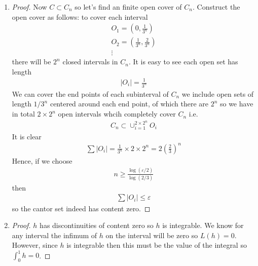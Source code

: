\begin{enumerate}[label=(\alph*)]
    \item 
    \begin{proof}
        Now $C\subset C_n$ so let's find an finite open cover of 
        $C_n$. Construct the open cover as follows: to cover each interval 
        \begin{gather*}
            O_1 = (0,\frac{1}{3^n}) \\
            O_2 = (\frac{1}{3^n},\frac{2}{3^n}) \\
            \vdots
        \end{gather*}
        there will be $2^n$ closed intervals in $C_n$. It is easy to see 
        each open set has length 
        \begin{align*}
            |O_i| = \frac{1}{3^n}
        \end{align*}
        We can cover the end points of each subinterval of $C_n$ we include 
        open sets of length $1/3^n$ centered around each end point, of which 
        there are $2^n$ so we have in total $2\times 2^n$ open intervals whcih 
        completely cover $C_n$ i.e. 
        \begin{align*}
            C_n \subset \cup_{i=1}^{2 \times 2^n} O_i
        \end{align*}
        It is clear 
        \begin{align*}
            \sum |O_i| = \frac{1}{3^n} \times 2\times 2^n = 2(\frac{2}{3})^n
        \end{align*}
        Hence, if we choose 
        \begin{align*}
            n\geq \frac{\log (\varepsilon/2)}{\log(2/3)}
        \end{align*}
        then 
        \begin{align*}
            \sum |O_i| \leq \varepsilon
        \end{align*}
        so the cantor set indeed has content zero.
    \end{proof}

    \item 
    \begin{proof}
        $h$ has discontinuities of content zero so $h$ is integrable. 
        We know for any interval the infimum of $h$ on the interval will 
        be zero so $L(h)=0$. However, since $h$ is integrable then this 
        must be the value of the integral so $\int_0^1 h = 0$.
    \end{proof}
\end{enumerate}